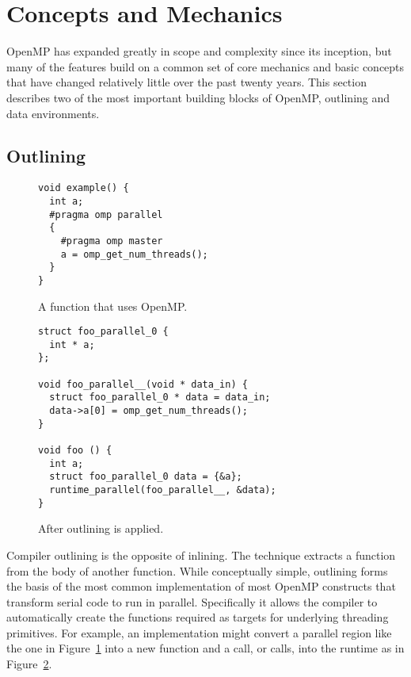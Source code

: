 \section{Concepts and Mechanics}
\label{sec:concepts}

OpenMP has expanded greatly in scope and complexity since its inception, but
many of the features build on a common set of core mechanics and basic concepts
that have changed relatively little over the past twenty years.  This section
describes two of the most important building blocks of OpenMP, outlining and
data environments.

\subsection{Outlining}
\label{sub:outlining}

\begin{figure}
\begin{verbatim}
void example() {
  int a;
  #pragma omp parallel
  {
    #pragma omp master
    a = omp_get_num_threads();
  }
}
\end{verbatim}
\caption{A function that uses OpenMP.\label{fig:outline-before}}
\end{figure}

\begin{figure}
\begin{verbatim}
struct foo_parallel_0 {
  int * a;
};

void foo_parallel__(void * data_in) {
  struct foo_parallel_0 * data = data_in;
  data->a[0] = omp_get_num_threads();
}

void foo () {
  int a;
  struct foo_parallel_0 data = {&a};
  runtime_parallel(foo_parallel__, &data);
}
\end{verbatim}
\caption{After outlining is applied.\label{fig:outline-after}}
\end{figure}

Compiler outlining is the opposite of inlining. The technique extracts a
function from the body of another function. While conceptually simple, outlining
forms the basis of the most common implementation of most OpenMP constructs that
transform serial code to run in parallel. Specifically it allows the compiler to
automatically create the functions required as targets for underlying
threading primitives. For example, an implementation might
convert a parallel region like the one in Figure~\ref{fig:outline-before} into a
new function and a call, or calls, into the runtime as in
Figure~\ref{fig:outline-after}.

